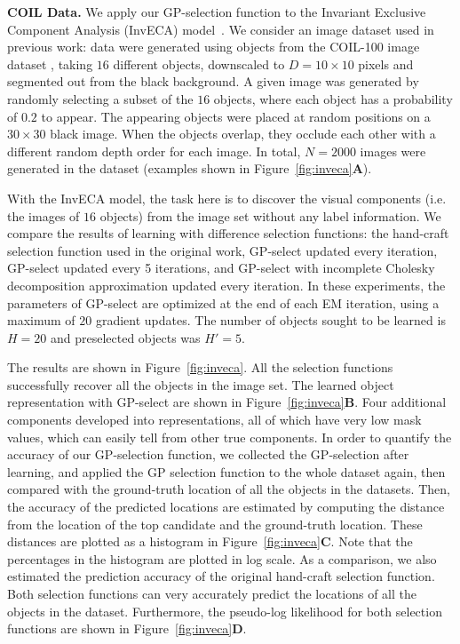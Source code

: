 \textbf{COIL Data.}
We apply our GP-selection function to the Invariant Exclusive Component Analysis (InvECA) model~\citep{DaiEtAl2013}.
We consider an image dataset used in previous work: data were generated using objects from the COIL-100 image dataset \citep{coil100}, taking $16$ different objects, downscaled to $D=10 \times 10$ pixels and segmented out from the black background.
A given image was generated by randomly selecting a subset of the $16$ objects, where each object has a probability of $0.2$ to appear.
The appearing objects were placed at random positions on a $30 \times 30$ black image.
When the objects overlap, they occlude each other with a different random depth order for each image.
In total, $N=2000$ images were generated in the dataset (examples shown in Figure~\ref{fig:inveca}\textbf{A}).

With the InvECA model, the task here is to discover the visual components (i.e. the images of $16$ objects) from the image set without any label information. We compare the results of learning with difference selection functions: the hand-craft selection function used in the original work, GP-select updated every iteration, GP-select updated every 5 iterations, and GP-select with incomplete Cholesky decomposition approximation updated every iteration. In these experiments, the parameters of GP-select are optimized at the end of each EM iteration, using a maximum of $20$ gradient updates.
The number of objects sought to be learned is $H=20$ and preselected objects was $H'=5$.

The results are shown in Figure~\ref{fig:inveca}. All the selection functions successfully recover all the objects in the image set. The learned object representation with GP-select are shown in Figure~\ref{fig:inveca}\textbf{B}.
Four additional components developed into representations, all of which have very low mask values,  which can easily tell from other true components.
In order to quantify the accuracy of our GP-selection function, we collected the GP-selection after learning, and applied the GP selection function to the whole dataset again, then compared with the ground-truth location of all the objects in the datasets.
%
Then, the accuracy of the predicted locations are estimated by computing the distance from the location of the top candidate and the ground-truth location.
These distances are plotted as a histogram in Figure~\ref{fig:inveca}\textbf{C}. Note that the percentages in the histogram are plotted in log scale.
As a comparison, we also estimated the prediction accuracy of the original hand-craft selection function. Both selection functions can very accurately predict the locations of all the objects in the dataset.
Furthermore, the pseudo-log likelihood \cite{DaiEtAl2013}  for both selection functions are shown in Figure~\ref{fig:inveca}\textbf{D}.

